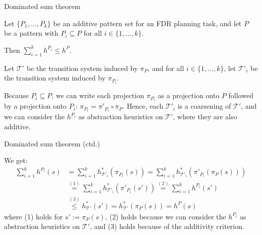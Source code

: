 \documentclass{gkibeamer}
\begin{document}
\begin{frame}{Dominated sum theorem}
  \begin{theorem}
    Let $\{P_1, \dots, P_k\}$ be an additive pattern set for an FDR
    planning task, and let $P$ be a pattern with $P_i \subseteq P$ for
    all $i \in \{1, \dots, k\}$.
    
    \smallskip

    Then $\sum_{i=1}^k h^{P_i} \le h^P$.
  \end{theorem}

  \pause

  \begin{proofstart}
    Let $\mathcal T'$ be the transition system induced by $\pi_P$,
    and for all $i \in \{1, \dots, k\}$, let $\mathcal T'_i$ be
    the transition system induced by $\pi_{P_i}$.

    Because $P_i \subseteq P$, we can write each projection
    $\pi_{P_i}$ as a projection onto $P$ followed by a projection onto
    $P_i$: $\pi_{P_i} = \pi'_{P_i} \circ \pi_P$. Hence, each $\mathcal
    T'_i$ is a coarsening of $\mathcal T'$, and we can consider the
    $h^{P_i}$ as \alert{abstraction heuristics on $\mathcal T'$},
    where they are also additive.
  \end{proofstart}
\end{frame}

\begin{frame}{Dominated sum theorem (ctd.)}
  \begin{proofend}
    We get:
    \begin{align*}
      \sum_{i=1}^k h^{P_i}(s)
      & {} =
      \sum_{i=1}^k h_{\mathcal T'_i}^*(\pi_{P_i}(s))
      = \sum_{i=1}^k h_{\mathcal T'_i}^*(\pi'_{P_i}(\pi_P(s)))
      \\ & {} \stackrel{(1)}{=}
      \sum_{i=1}^k h_{\mathcal T'_i}^*(\pi'_{P_i}(s'))
      \stackrel{(2)}{=} \sum_{i=1}^k h^{P_i}(s')
      \\ & {} \stackrel{(3)}{\le}
      h_{\mathcal T'}^*(s')
      = h_{\mathcal T'}^*(\pi_P(s))
      = h^P(s)
    \end{align*}
    where (1) holds for $s' := \pi_P(s)$, (2) holds because we can
    consider the $h^{P_i}$ as abstraction heuristics on $\mathcal T'$,
    and (3) holds because of the additivity criterion.
  \end{proofend}
\end{frame}
\end{document}
